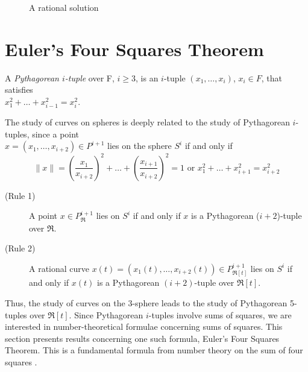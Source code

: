 \begin{figure}[h]
\vspace{2.5in}
\caption{A rational solution}
\label{fig6}
\end{figure}

\onecolumn

\section{Euler's Four Squares Theorem}

\begin{defn2}
A {\em Pythagorean $i$-tuple} over F, $i \geq 3$, is an $i$-tuple 
$(x_1,\ldots,x_i)$, $x_i \in F$, that satisfies \\
$x_1^2 + \ldots + x_{i-1}^2 = x_{i}^2$.
\end{defn2}

The study of curves on spheres is deeply related to the study of Pythagorean 
$i$-tuples, since a point \\
$x = (x_1,\ldots,x_{i+2}) \in P^{i+1}$ lies on the sphere $S^i$ if and only if
\[
     \|x\| = (\frac{x_1}{x_{i+2}})^2 + \ldots + (\frac{x_{i+1}}{x_{i+2}})^2 = 1
\mbox{\ \ \  or \ \ \ }  
      x_1^2 + \ldots + x_{i+1}^2 = x_{i+2}^2
\]
\begin{description}
\item[(Rule 1)]
A point $x \in P_{\Re}^{i+1}$ lies on $S^i$ if and only if
$x$ is a Pythagorean ($i+2$)-tuple over $\Re$.
\item[(Rule 2)]
A rational curve 
$x(t) = (x_1(t),\ldots,x_{i+2}(t)) \in P_{\Re[t]}^{i+1}$ lies on $S^i$
if and only if $x(t)$ is a Pythagorean $(i+2)$-tuple over $\Re[t]$.
\end{description}

Thus, the study of curves on the 3-sphere leads to the study of Pythagorean
5-tuples over $\Re[t]$.
Since Pythagorean $i$-tuples involve sums of squares, we are
interested in number-theoretical formulae concerning sums of squares.
This section presents results concerning one such formula,
Euler's Four Squares Theorem.
This is a fundamental formula from number theory
on the sum of four squares \cite{dickson52, ebbinghaus90}.

